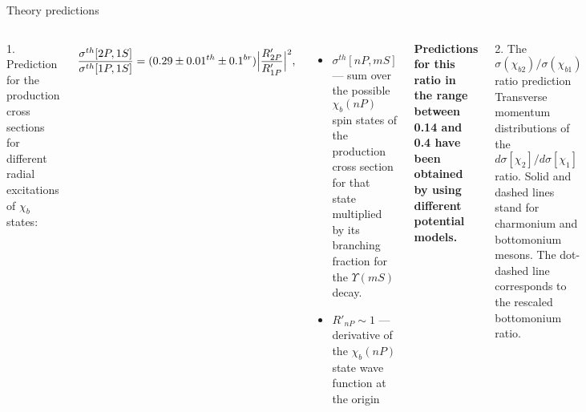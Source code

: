 \begin{frame}{Theory predictions}

\footnotesize

\begin{columns}[t]
1. Prediction for the production cross sections for different radial excitations of $\chi_b$ states:

$$
\frac{\sigma^{th}[2P,1S]}{\sigma^{th}[1P,1S]} = (0.29 \pm 0.01^{th} \pm 0.1^{br}) \Bigl| \frac{R'_{2P}}{R'_{1P}}\Bigr|^2, 
$$
\begin{itemize}
\item  $\sigma^{th}[nP,mS]$ ---  sum over the possible $\chi_b(nP)$ spin
states of the production cross section for that state multiplied by its
branching fraction for the $\Upsilon(mS)$ decay.
\item $R'_{nP} \sim 1$ --- derivative of the $\chi_b(nP)$ state wave function at the origin
\end{itemize}

\textbf{Predictions for this
ratio in the range between 0.14 and 0.4 have been obtained by using different
potential models.}

2. The $\sigma(\chi_{b2})/\sigma(\chi_{b1})$ ratio prediction
Transverse momentum distributions of the
$d\sigma\left[\chi_{2}\right]/d\sigma[\chi_{1}]$ ratio. Solid and dashed lines
stand for charmonium and bottomonium mesons. The dot-dashed line corresponds to
the rescaled bottomonium ratio.
\end{columns}
\end{frame}